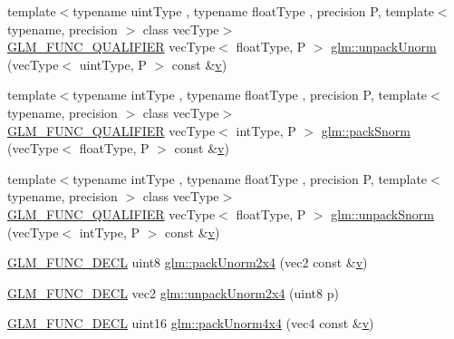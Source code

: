 \begin{DoxyCompactItemize}
\item 
{\footnotesize template$<$typename uint\+Type , typename float\+Type , precision P, template$<$ typename, precision $>$ class vec\+Type$>$ }\\\mbox{\hyperlink{setup_8hpp_a33fdea6f91c5f834105f7415e2a64407}{G\+L\+M\+\_\+\+F\+U\+N\+C\+\_\+\+Q\+U\+A\+L\+I\+F\+I\+ER}} vec\+Type$<$ float\+Type, P $>$ \mbox{\hyperlink{group__gtc__packing_gad3d7e1ec7fcfb7ae341658e2ce1c3bd9}{glm\+::unpack\+Unorm}} (vec\+Type$<$ uint\+Type, P $>$ const \&\mbox{\hyperlink{glad_8h_a14cfbe2fc2234f5504618905b69d1e06}{v}})
\item 
{\footnotesize template$<$typename int\+Type , typename float\+Type , precision P, template$<$ typename, precision $>$ class vec\+Type$>$ }\\\mbox{\hyperlink{setup_8hpp_a33fdea6f91c5f834105f7415e2a64407}{G\+L\+M\+\_\+\+F\+U\+N\+C\+\_\+\+Q\+U\+A\+L\+I\+F\+I\+ER}} vec\+Type$<$ int\+Type, P $>$ \mbox{\hyperlink{group__gtc__packing_ga1be760860697db386b36513aeafe9d5e}{glm\+::pack\+Snorm}} (vec\+Type$<$ float\+Type, P $>$ const \&\mbox{\hyperlink{glad_8h_a14cfbe2fc2234f5504618905b69d1e06}{v}})
\item 
{\footnotesize template$<$typename int\+Type , typename float\+Type , precision P, template$<$ typename, precision $>$ class vec\+Type$>$ }\\\mbox{\hyperlink{setup_8hpp_a33fdea6f91c5f834105f7415e2a64407}{G\+L\+M\+\_\+\+F\+U\+N\+C\+\_\+\+Q\+U\+A\+L\+I\+F\+I\+ER}} vec\+Type$<$ float\+Type, P $>$ \mbox{\hyperlink{group__gtc__packing_ga63eeec0d416e48462f341f4a7a9a45fe}{glm\+::unpack\+Snorm}} (vec\+Type$<$ int\+Type, P $>$ const \&\mbox{\hyperlink{glad_8h_a14cfbe2fc2234f5504618905b69d1e06}{v}})
\item 
\mbox{\hyperlink{setup_8hpp_ab2d052de21a70539923e9bcbf6e83a51}{G\+L\+M\+\_\+\+F\+U\+N\+C\+\_\+\+D\+E\+CL}} uint8 \mbox{\hyperlink{group__gtc__packing_gad68eb2f848ba867192b8787998c0595a}{glm\+::pack\+Unorm2x4}} (vec2 const \&\mbox{\hyperlink{glad_8h_a14cfbe2fc2234f5504618905b69d1e06}{v}})
\item 
\mbox{\hyperlink{setup_8hpp_ab2d052de21a70539923e9bcbf6e83a51}{G\+L\+M\+\_\+\+F\+U\+N\+C\+\_\+\+D\+E\+CL}} vec2 \mbox{\hyperlink{group__gtc__packing_ga3afb0452954320f2d83fe6f38cb24147}{glm\+::unpack\+Unorm2x4}} (uint8 p)
\item 
\mbox{\hyperlink{setup_8hpp_ab2d052de21a70539923e9bcbf6e83a51}{G\+L\+M\+\_\+\+F\+U\+N\+C\+\_\+\+D\+E\+CL}} uint16 \mbox{\hyperlink{group__gtc__packing_gad493c9f130e91dd8a4b360b05dcea573}{glm\+::pack\+Unorm4x4}} (vec4 const \&\mbox{\hyperlink{glad_8h_a14cfbe2fc2234f5504618905b69d1e06}{v}})

\end{DoxyCompactItemize}
